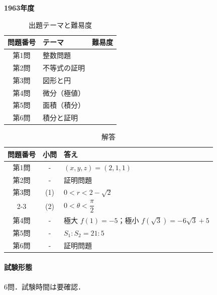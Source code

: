 \documentclass[../../main.tex]{subfiles}
\begin{document}
\begin{center}
  {\fontsize{48pt}{58pt}\selectfont \textbf{1963}\normalsize\textbf{年度}}
\end{center}

\begin{table}[htb]
  \centering
  \caption{出題テーマと難易度}
  \begin{tabular}{|c|p{9cm}|c|}
    \hline
    \textbf{問題番号} & \textbf{テーマ} & \textbf{難易度} \\
    \hline
    第1問 & 整数問題 & \\
    \hline
    第2問 & 不等式の証明 & \\
    \hline
    第3問 & 図形と円 & \\
    \hline
    第4問 & 微分（極値） & \\
    \hline
    第5問 & 面積（積分） & \\
    \hline
    第6問 & 積分と証明 & \\
    \hline
  \end{tabular}
\end{table}

\begin{table}[htb]
  \centering
  \caption{解答}
  \renewcommand{\arraystretch}{1.4}
  \begin{tabular}{|c|c|p{9cm}|}
    \hline
    \textbf{問題番号} & \textbf{小問} & \textbf{答え} \\
    \hline
    第1問 & - & $(x,y,z)=(2,1,1)$ \\
    \hline
    第2問 & - & 証明問題 \\
    \hline
    第3問 & (1) & $0<r<2-\sqrt{2}$ \\
    \cline{2-3}
    & (2) & $0<\theta<\dfrac{\pi}{2}$ \\
    \hline
    第4問 & - & 極大 $f(1)=-5$；極小 $f(\sqrt{3})=-6\sqrt{3}+5$ \\
    \hline
    第5問 & - & $S_1:S_2=21:5$ \\
    \hline
    第6問 & - & 証明問題 \\
    \hline
  \end{tabular}
\end{table}

\paragraph{試験形態}
6問．試験時間は要確認．
\end{document}
